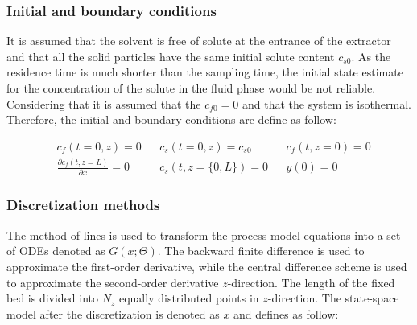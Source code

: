 \documentclass[../Article_Model_Parameters.tex]{subfiles}
\begin{document}
		\subsubsection{Initial and boundary conditions} 
		It is assumed that the solvent is free of solute at the entrance of the extractor and that all the solid particles have the same initial solute content $c_{s0}$. As the residence time is much shorter than the sampling time, the initial state estimate for the concentration of the solute in the fluid phase would be not reliable. Considering that it is assumed that the $c_{f0}=0$ and that the system is isothermal. %
		Therefore, the initial and boundary conditions are define as follow:
			

			
			{\footnotesize
				\begin{align*}
					&c_f(t = 0, z) = 0 && c_s(t = 0, z) = c_{s0} && {c_f}(t, z=0) = 0 \\
					&\frac{\partial c_f(t,z=L)}{\partial x} = 0 && c_s(t, z=\{0,L\}) = 0 && y(0) = 0
			\end{align*} }
			
		\subsubsection{Discretization methods}
		
		The method of lines is used to transform the process model equations into a set of ODEs denoted as $G(x;\Theta)$. The backward finite difference is used to approximate the first-order derivative, while the central difference scheme is used to approximate the second-order derivative $z$-direction. The length of the fixed bed is divided into $N_z$ equally distributed points in $z$-direction. The state-space model after the discretization is denoted as $x$ and defines as follow:
		
\end{document}
